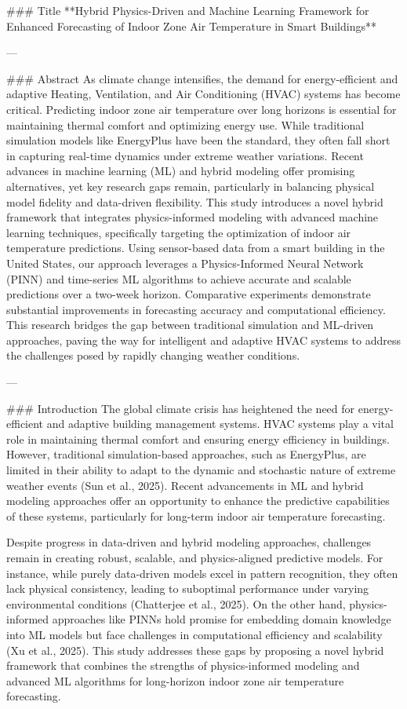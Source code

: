 ### Title  
**Hybrid Physics-Driven and Machine Learning Framework for Enhanced Forecasting of Indoor Zone Air Temperature in Smart Buildings**

---

### Abstract  
As climate change intensifies, the demand for energy-efficient and adaptive Heating, Ventilation, and Air Conditioning (HVAC) systems has become critical. Predicting indoor zone air temperature over long horizons is essential for maintaining thermal comfort and optimizing energy use. While traditional simulation models like EnergyPlus have been the standard, they often fall short in capturing real-time dynamics under extreme weather variations. Recent advances in machine learning (ML) and hybrid modeling offer promising alternatives, yet key research gaps remain, particularly in balancing physical model fidelity and data-driven flexibility. This study introduces a novel hybrid framework that integrates physics-informed modeling with advanced machine learning techniques, specifically targeting the optimization of indoor air temperature predictions. Using sensor-based data from a smart building in the United States, our approach leverages a Physics-Informed Neural Network (PINN) and time-series ML algorithms to achieve accurate and scalable predictions over a two-week horizon. Comparative experiments demonstrate substantial improvements in forecasting accuracy and computational efficiency. This research bridges the gap between traditional simulation and ML-driven approaches, paving the way for intelligent and adaptive HVAC systems to address the challenges posed by rapidly changing weather conditions.

---

### Introduction  
The global climate crisis has heightened the need for energy-efficient and adaptive building management systems. HVAC systems play a vital role in maintaining thermal comfort and ensuring energy efficiency in buildings. However, traditional simulation-based approaches, such as EnergyPlus, are limited in their ability to adapt to the dynamic and stochastic nature of extreme weather events (Sun et al., 2025). Recent advancements in ML and hybrid modeling approaches offer an opportunity to enhance the predictive capabilities of these systems, particularly for long-term indoor air temperature forecasting.

Despite progress in data-driven and hybrid modeling approaches, challenges remain in creating robust, scalable, and physics-aligned predictive models. For instance, while purely data-driven models excel in pattern recognition, they often lack physical consistency, leading to suboptimal performance under varying environmental conditions (Chatterjee et al., 2025). On the other hand, physics-informed approaches like PINNs hold promise for embedding domain knowledge into ML models but face challenges in computational efficiency and scalability (Xu et al., 2025). This study addresses these gaps by proposing a novel hybrid framework that combines the strengths of physics-informed modeling and advanced ML algorithms for long-horizon indoor zone air temperature forecasting.

